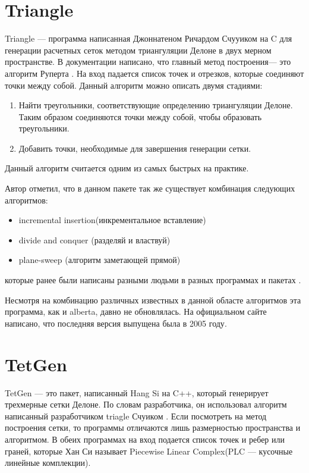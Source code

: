 \section{Triangle}
Triangle --- программа написанная Джоннатеном Ричардом Счууиком на C для генерации расчетных сеток методом триангуляции Делоне в двух мерном пространстве. В документации написано, что главный метод построения--- это алгоритм Руперта \cite[c.~1,3]{triangle}. На вход падается список точек и отрезков, которые соединяют точки между собой. Данный алгоритм можно описать двумя стадиями:
\begin{enumerate}
    \item Найти треугольники, соответствующие определению триангуляции Делоне. Таким образом соединяются точки между собой, чтобы образовать треугольники.
    \item Добавить точки, необходимые для завершения генерации сетки.
\end{enumerate}
Данный алгоритм считается одним из самых быстрых на практике\cite[c.~3]{triangle}.

Автор отметил, что в данном пакете так же существует комбинация следующих алгоритмов:
\begin{itemize}
    \item incremental insertion(инкрементальное вставление)
    \item divide and conquer (разделяй и властвуй)
    \item plane-sweep (алгоритм заметающей прямой)
\end{itemize}
которые ранее были написаны разными людьми в разных программах и пакетах \cite[c.~1]{triangle}.

Несмотря на комбинацию различных известных в данной областе алгоритмов эта программа, как и alberta, давно не обновлялась. На официальном сайте написано, что последняя версия выпущена была в 2005 году\cite{tricite}. 

\section{TetGen}

TetGen --- это пакет, написанный Hang Si на C++, который генерирует трехмерные сетки Делоне. По словам разработчика, он использовал алгоритм написанный разработчиком triagle Счуиком \cite[c.~]{tetgen}. Если посмотреть на метод построения сетки, то программы отличаются лишь размерностью пространства и алгоритмом. В обеих программах на вход подается список точек и ребер или граней, которые Хан Си называет Piecewise Linear Complex(PLC --- кусочные линейные комплекции)\cite[c.~7]{tetgen}. 

